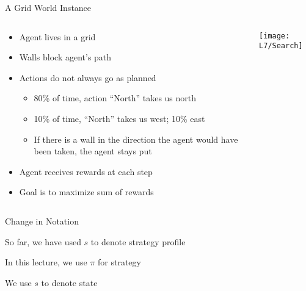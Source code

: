 \documentclass[11pt,aspectratio=169,handout]{beamer}
\begin{document}
  
  \begin{frame}{A Grid World Instance}
   \begin{columns}
    \begin{column}{0.6\textwidth}
     \begin{itemize}
     \setlength{\itemsep}{0.5em}
      \item Agent lives in a grid
      \item Walls block agent's path
      \item Actions do not always go as planned
      \begin{itemize}
       \item 80\% of time, action ``North'' takes us north
       \item 10\% of time, ``North'' takes us west; 10\% east
       \item If there is a wall in the direction the agent would have been taken, the agent stays put
      \end{itemize}
      \item Agent receives rewards at each step
      \item Goal is to maximize sum of rewards
     \end{itemize}
    \end{column}
    \begin{column}{0.4\textwidth}
     \begin{center}
      \texttt{[image: L7/Search]}
     \end{center}
    \end{column}
   \end{columns}
  \end{frame}
  
  
  \begin{frame}{Change in Notation}
   \begin{itemizes}[2em]
    \item So far, we have used \alert{$s$} to denote \alert{strategy profile}
    \item In this lecture, we use \alert{$\pi$} for strategy
    \item We use \alert{$s$} to denote \alert{state}
   \end{itemizes}
  \end{frame}
  
\end{document}
